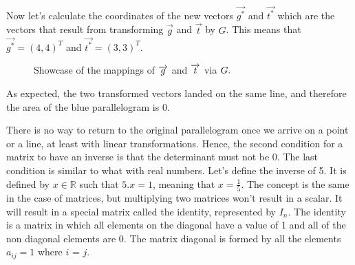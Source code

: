 \documentclass[a4,12pt,twosided,openany]{memoir}
\begin{document}
\par 
\indent
Now let’s calculate the coordinates of the new vectors $\overrightarrow{g^*}$ and $\overrightarrow{t^*}$ which are the vectors that result from transforming $\overrightarrow{g}$ and $\overrightarrow{t}$ by $G$. This means that $\overrightarrow{g^*} = (4,4)^T$ and $\overrightarrow{t^*} = (3,3)^T$.
\begin{figure}[h!]
\begin{center}
\end{center}
\caption{Showcase of the mappings of $\protect\overrightarrow{g}$ and $\protect\overrightarrow{t}$ via $\protect G.$}
\end{figure}

\par 
\indent
As expected, the two transformed vectors landed on the same line, and therefore the area of the blue parallelogram is 0.\par 
\indent
There is no way to return to the original parallelogram once we arrive on a point or a line, at least with linear transformations. Hence, the second condition for a matrix to have an inverse is that the determinant must not be 0. The last condition is similar to what with real numbers. Let’s define the inverse of 5. It is defined by $x \in \mathbb{R}$ such that $5.x=1$, meaning that $x = \frac{1}{5}$. The concept is the same in the case of matrices, but multiplying two matrices won’t result in a scalar. It will result in a special matrix called the identity, represented by $I_n$. The identity is a matrix in which all elements on the diagonal have a value of 1 and all of the non diagonal elements are 0. The matrix diagonal is formed by all the elements $a_{ij} = 1$ where $i$ = $j$.
\end{document}
